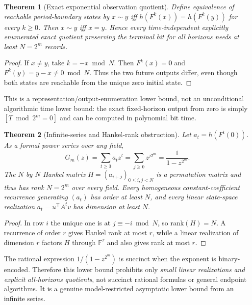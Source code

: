 \documentclass[11pt]{article}
\newtheorem{theorem}{Theorem}
\begin{document}
\begin{theorem}[Exact exponential observation quotient]
Define equivalence of reachable period-boundary states by $x\sim y$ iff $h(F^k(x))=h(F^k(y))$ for every $k\ge0$. Then $x\sim y$ iff $x=y$. Hence every time-independent explicitly enumerated exact quotient preserving the terminal bit for \emph{all horizons} needs at least $N=2^m$ records.
\end{theorem}
\begin{proof}
If $x\ne y$, take $k=-x\bmod N$. Then $F^k(x)=0$ and $F^k(y)=y-x\ne0\bmod N$. Thus the two future outputs differ, even though both states are reachable from the unique zero initial state.
\end{proof}
This is a representation/output-enumeration lower bound, not an unconditional algorithmic time lower bound: the exact fixed-horizon output from zero is simply $[T\bmod2^m=0]$ and can be computed in polynomial bit time.

\begin{theorem}[Infinite-series and Hankel-rank obstruction]
Let $a_t=h(F^t(0))$. As a formal power series over any field,
\[
G_m(z)=\sum_{t\ge0}a_tz^t=\sum_{j\ge0}z^{j2^m}=\frac1{1-z^{2^m}}.
\]
The $N$ by $N$ Hankel matrix $H=(a_{i+j})_{0\le i,j<N}$ is a permutation matrix and thus has rank $N=2^m$ over every field. Every homogeneous constant-coefficient recurrence generating $(a_t)$ has order at least $N$, and every linear state-space realization $a_t=u^\top A^tv$ has dimension at least $N$.
\end{theorem}
\begin{proof}
In row $i$ the unique one is at $j\equiv-i\bmod N$, so $\mathrm{rank}(H)=N$. A recurrence of order $r$ gives Hankel rank at most $r$, while a linear realization of dimension $r$ factors $H$ through $\mathbb F^r$ and also gives rank at most $r$. 
\end{proof}
The rational expression $1/(1-z^{2^m})$ is succinct when the exponent is binary-encoded. Therefore this lower bound prohibits only \emph{small linear realizations and explicit all-horizons quotients}, not succinct rational formulas or general endpoint algorithms. It is a genuine model-restricted asymptotic lower bound from an infinite series.
\end{document}
